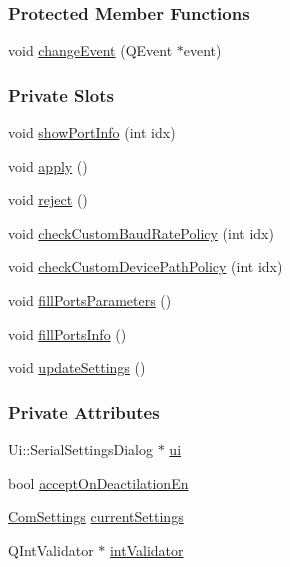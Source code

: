 \subsubsection*{Protected Member Functions}
\begin{DoxyCompactItemize}
\item 
void \mbox{\hyperlink{classSerialSettingsDialog_a1222ce503cf2d974869a674f186e4a11}{change\+Event}} (Q\+Event $\ast$event)
\end{DoxyCompactItemize}
\subsubsection*{Private Slots}
\begin{DoxyCompactItemize}
\item 
void \mbox{\hyperlink{classSerialSettingsDialog_a51bd57a094957fabb106e82b2a2fdcda}{show\+Port\+Info}} (int idx)
\item 
void \mbox{\hyperlink{classSerialSettingsDialog_a9172ba98481da3828d9825aa89fd2dd1}{apply}} ()
\item 
void \mbox{\hyperlink{classSerialSettingsDialog_ab0238e08301e18f365ab2239f129d868}{reject}} ()
\item 
void \mbox{\hyperlink{classSerialSettingsDialog_a3a731f098e834b3d17bc5ec0c2da64a5}{check\+Custom\+Baud\+Rate\+Policy}} (int idx)
\item 
void \mbox{\hyperlink{classSerialSettingsDialog_a784ef564d042f439ad94a2694a1ecbaf}{check\+Custom\+Device\+Path\+Policy}} (int idx)
\item 
void \mbox{\hyperlink{classSerialSettingsDialog_a4b813dfa2e8318f4d086e718b441d12e}{fill\+Ports\+Parameters}} ()
\item 
void \mbox{\hyperlink{classSerialSettingsDialog_a1b23a2eccc90ff6e9d50887e135584c8}{fill\+Ports\+Info}} ()
\item 
void \mbox{\hyperlink{classSerialSettingsDialog_ad41af1d1aba6bebce04969e141b914d4}{update\+Settings}} ()
\end{DoxyCompactItemize}
\subsubsection*{Private Attributes}
\begin{DoxyCompactItemize}
\item 
Ui\+::\+Serial\+Settings\+Dialog $\ast$ \mbox{\hyperlink{classSerialSettingsDialog_afc0d38e2824ab62ed7de597c97d012f7}{ui}}
\item 
bool \mbox{\hyperlink{classSerialSettingsDialog_ab87bf1b0042d98315035b07f4e340e0e}{accept\+On\+Deactilation\+En}}
\item 
\mbox{\hyperlink{structComSettings}{Com\+Settings}} \mbox{\hyperlink{classSerialSettingsDialog_ab24259a0385b292ff104425d97957482}{current\+Settings}}
\item 
Q\+Int\+Validator $\ast$ \mbox{\hyperlink{classSerialSettingsDialog_a0bd028bb39cf3db3b297a1899d3d835a}{int\+Validator}}
\end{DoxyCompactItemize}


